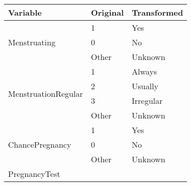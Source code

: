 \begin{table}[H]
	\centering

    \label{table:Table_Menstruation_Info_Transform_Categories}
    
	\renewcommand{\arraystretch}{1.5}

    \begin{tabular}{l | l | l}
		\hline
        \rowcolor[HTML]{FF9999}		
		
        \textbf{Variable} & \textbf{Original} & \textbf{Transformed} \\ 		
        
        \hline 
                                    
            \multirow{3}{*}{Menstruating}
                                    
                & \multicolumn{1}{l}{1}     & \multicolumn{1}{l}{Yes}       \\\cline{2-3}
                & \multicolumn{1}{l}{0}     & \multicolumn{1}{l}{No}        \\\cline{2-3}
                & \multicolumn{1}{l}{Other} & \multicolumn{1}{l}{Unknown}   \\\hline
                                    
            \multirow{4}{*}{MenstruationRegular}
				
            	& \multicolumn{1}{l}{1}     & \multicolumn{1}{l}{Always}    \\\cline{2-3}
                & \multicolumn{1}{l}{2}     & \multicolumn{1}{l}{Usually}   \\\cline{2-3}
                & \multicolumn{1}{l}{3}     & \multicolumn{1}{l}{Irregular} \\\cline{2-3}
                & \multicolumn{1}{l}{Other} & \multicolumn{1}{l}{Unknown}   \\\hline
                                    
            \multirow{3}{*}{ChancePregnancy}
            
                & \multicolumn{1}{l}{1}     & \multicolumn{1}{l}{Yes}       \\\cline{2-3}
                & \multicolumn{1}{l}{0}     & \multicolumn{1}{l}{No}        \\\cline{2-3}
                & \multicolumn{1}{l}{Other} & \multicolumn{1}{l}{Unknown}   \\\hline
                                    
            \multirow{4}{*}{PregnancyTest}
            

\end{tabular}
\end{table}
